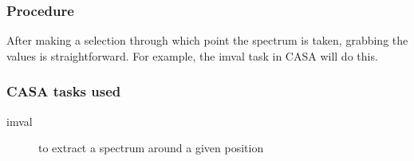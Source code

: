 \subsubsection{Procedure}

After making a selection through which point the spectrum is taken,
grabbing the values is straightforward. For example, the imval task
in CASA will do this.

\subsubsection{CASA tasks used}

\begin{description}

\item[imval] to extract a spectrum around a given position 

\end{description}

\clearpage
